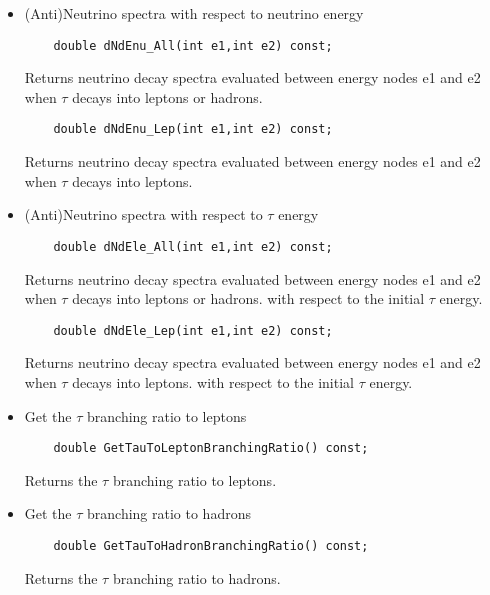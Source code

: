 \begin{itemize}
\item (Anti)Neutrino spectra with respect to neutrino energy
  \begin{lstlisting}
    double dNdEnu_All(int e1,int e2) const;
  \end{lstlisting}
  Returns neutrino decay spectra evaluated between energy nodes  {\ttfamily e1} and {\ttfamily e2} when $\tau$ decays into leptons or hadrons.
  \begin{lstlisting}
    double dNdEnu_Lep(int e1,int e2) const;
  \end{lstlisting}
  Returns neutrino decay spectra evaluated between energy nodes  {\ttfamily e1} and {\ttfamily e2} when $\tau$ decays into leptons.
\item (Anti)Neutrino spectra with respect to $\tau$ energy
  \begin{lstlisting}
    double dNdEle_All(int e1,int e2) const;
  \end{lstlisting}
    Returns neutrino decay spectra evaluated between energy nodes  {\ttfamily e1} and {\ttfamily e2} when $\tau$ decays into leptons or hadrons. with
    respect to the initial $\tau$ energy.
  \begin{lstlisting}
    double dNdEle_Lep(int e1,int e2) const;
  \end{lstlisting}
     Returns neutrino decay spectra evaluated between energy nodes  {\ttfamily e1} and {\ttfamily e2} when $\tau$ decays into leptons. with
    respect to the initial $\tau$ energy.
\item Get the $\tau$ branching ratio to leptons
  \begin{lstlisting}
    double GetTauToLeptonBranchingRatio() const;
  \end{lstlisting}
    Returns the $\tau$ branching ratio to leptons.
\item Get the $\tau$ branching ratio to hadrons
  \begin{lstlisting}
    double GetTauToHadronBranchingRatio() const;
  \end{lstlisting}
    Returns the $\tau$ branching ratio to hadrons.
\end{itemize}
